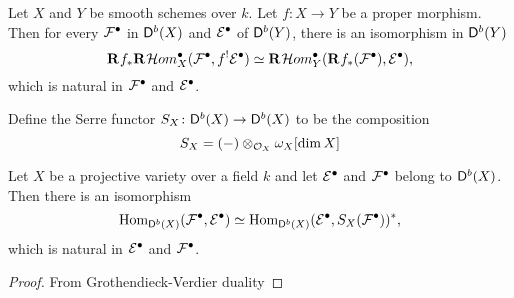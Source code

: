 \begin{theorem}
    Let $X$ and $Y$ be smooth schemes over $k$. Let $f \colon X \to Y$ be a proper morphism. Then for every $\mathcal F^\bullet$ in $\mathsf{D}^b(X)$ and $\mathcal E^\bullet$ of $\mathsf{D}^b(Y)$, there is an isomorphism in $\mathsf{D}^b(Y)$
    \[
        \mathbf{R}^{}f_*\mathbf{R}^{}\mathcal{H}om^\bullet_X(\mathcal F^\bullet, f^! \mathcal E^\bullet) \simeq \mathbf{R}^{}\mathcal{H}om^\bullet_Y(\mathbf{R}^{}f_*(\mathcal F^\bullet), \mathcal E^\bullet),
    \]
    which is natural in $\mathcal F^\bullet$ and $\mathcal E^\bullet$.

\end{theorem}

Define the Serre functor $S_X \colon \mathsf{D}^b(X) \to \mathsf{D}^b(X)$ to be the composition
\[
    S_X = (-) \otimes_{\mathcal{O}_{X}} \omega_X[\dim X]
\]

\begin{theorem}
    Let $X$ be a projective variety over a field $k$ and let $\mathcal E^\bullet$ and $\mathcal F^\bullet$ belong to $\mathsf{D}^b(X)$. Then there is an isomorphism
    \[
        \operatorname{Hom}_{\mathsf{D}^b(X)}(\mathcal F^\bullet, \mathcal E^\bullet) \simeq \operatorname{Hom}_{\mathsf{D}^b(X)}(\mathcal E^\bullet, S_X(\mathcal F^\bullet))^*,
    \]
    which is natural in $\mathcal E^\bullet$ and $\mathcal F^\bullet$.
\end{theorem}

\begin{proof}
    From Grothendieck-Verdier duality
\end{proof}